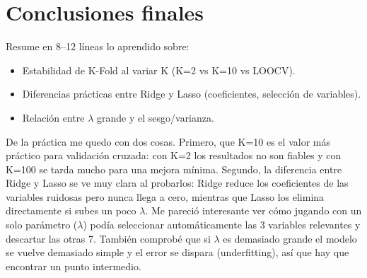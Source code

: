 \documentclass[../../__memoria.tex]{subfiles}
\begin{document}
\section[Conclusiones]{Conclusiones finales}
Resume en 8--12 líneas lo aprendido sobre:
\begin{itemize}
    \item Estabilidad de K-Fold al variar K (K=2 vs K=10 vs LOOCV).
    \item Diferencias prácticas entre Ridge y Lasso (coeficientes, selección de variables).
    \item Relación entre $\lambda$ grande y el sesgo/varianza.
\end{itemize}

\vspace{0.5cm}
\noindent De la práctica me quedo con dos cosas. Primero, que K=10 es el valor más práctico para validación cruzada: con K=2 los resultados no son fiables y con K=100 se tarda mucho para una mejora mínima. Segundo, la diferencia entre Ridge y Lasso se ve muy clara al probarlos: Ridge reduce los coeficientes de las variables ruidosas pero nunca llega a cero, mientras que Lasso los elimina directamente si subes un poco $\lambda$. Me pareció interesante ver cómo jugando con un solo parámetro ($\lambda$) podía seleccionar automáticamente las 3 variables relevantes y descartar las otras 7. También comprobé que si $\lambda$ es demasiado grande el modelo se vuelve demasiado simple y el error se dispara (underfitting), así que hay que encontrar un punto intermedio.
\end{document}

